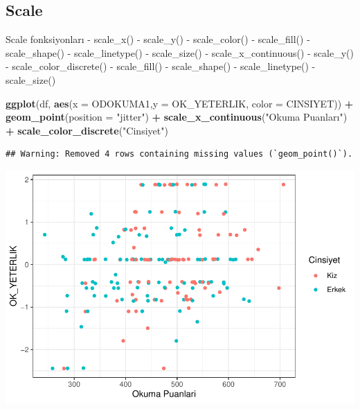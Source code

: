 \documentclass[
  oneside]{book}
\newenvironment{Shaded}{\begin{snugshade}}{\end{snugshade}}
\newcommand{\AttributeTok}[1]{\textcolor[rgb]{0.13,0.29,0.53}{#1}}
\newcommand{\FunctionTok}[1]{\textcolor[rgb]{0.13,0.29,0.53}{\textbf{#1}}}
\newcommand{\NormalTok}[1]{#1}
\newcommand{\SpecialCharTok}[1]{\textcolor[rgb]{0.81,0.36,0.00}{\textbf{#1}}}
\newcommand{\StringTok}[1]{\textcolor[rgb]{0.31,0.60,0.02}{#1}}
\begin{document}
\hypertarget{scale}{%
\subsection{Scale}\label{scale}}

Scale fonksiyonları
- scale\_x()
- scale\_y()
- scale\_color()
- scale\_fill()
- scale\_shape()
- scale\_linetype()
- scale\_size()
- scale\_x\_continuous()
- scale\_y()
- scale\_color\_discrete()
- scale\_fill()
- scale\_shape()
- scale\_linetype()
- scale\_size()

\begin{Shaded}
\begin{Highlighting}[]
\FunctionTok{ggplot}\NormalTok{(df, }\FunctionTok{aes}\NormalTok{(}\AttributeTok{x =}\NormalTok{ ODOKUMA1,}\AttributeTok{y =}\NormalTok{ OK\_YETERLIK, }\AttributeTok{color =}\NormalTok{ CINSIYET)) }\SpecialCharTok{+}
\FunctionTok{geom\_point}\NormalTok{(}\AttributeTok{position =} \StringTok{"jitter"}\NormalTok{) }\SpecialCharTok{+}
\FunctionTok{scale\_x\_continuous}\NormalTok{(}\StringTok{"Okuma Puanları"}\NormalTok{) }\SpecialCharTok{+}
\FunctionTok{scale\_color\_discrete}\NormalTok{(}\StringTok{"Cinsiyet"}\NormalTok{)}
\end{Highlighting}
\end{Shaded}

\begin{verbatim}
## Warning: Removed 4 rows containing missing values (`geom_point()`).
\end{verbatim}

\begin{center}\includegraphics[width=1\linewidth]{15-betimleyici-istatistik_files/figure-latex/unnamed-chunk-51-1} \end{center}
\end{document}

